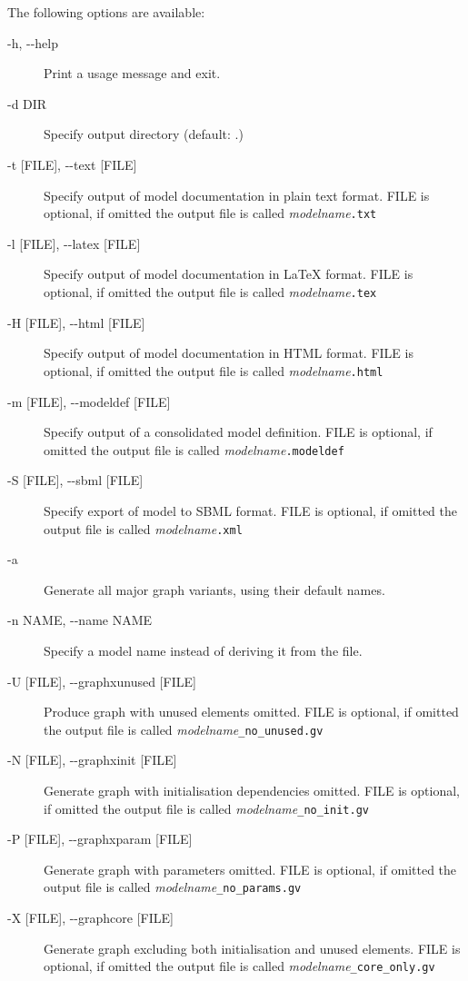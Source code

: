 \documentclass[a4paper,11pt]{article}
\begin{document}
The following options are available:

\begin{adjustwidth}{0.8cm}{0.8cm}
\begin{description}
\item[-h, -{}-help] Print a usage message and exit.
\item[-d DIR] Specify output directory (default: .)
\item[-t {[}FILE{]}, -{}-text {[}FILE{]}] Specify output of model documentation in plain text format. FILE is optional, if omitted the output file is called \textit{modelname}\texttt{.txt}
\item[-l {[}FILE{]}, -{}-latex {[}FILE{]}] Specify output of model documentation in \LaTeX{} format. FILE is optional, if omitted the output file is called \textit{modelname}\texttt{.tex}
\item[-H {[}FILE{]}, -{}-html {[}FILE{]}] Specify output of model documentation in HTML format. FILE is optional, if omitted the output file is called \textit{modelname}\texttt{.html}
\item[-m {[}FILE{]}, -{}-modeldef {[}FILE{]}] Specify output of a consolidated model definition. FILE is optional, if omitted the output file is called \textit{modelname}\texttt{.modeldef}
\item[-S {[}FILE{]}, -{}-sbml {[}FILE{]}] Specify export of model to SBML format. FILE is optional, if omitted the output file is called \textit{modelname}\texttt{.xml}
\item[-a] Generate all major graph variants, using their default names.
\item[-n NAME, -{}-name NAME] Specify a model name instead of deriving it from the file.
\item[-U {[}FILE{]}, -{}-graphxunused {[}FILE{]}] Produce graph with unused elements omitted. FILE is optional, if omitted the output file is called \textit{modelname}\texttt{\_no\_unused.gv}
\item[-N {[}FILE{]}, -{}-graphxinit {[}FILE{]}] Generate graph with initialisation dependencies omitted. FILE is optional, if omitted the output file is called \textit{modelname}\texttt{\_no\_init.gv}
\item[-P {[}FILE{]}, -{}-graphxparam {[}FILE{]}] Generate graph with parameters omitted. FILE is optional, if omitted the output file is called \textit{modelname}\texttt{\_no\_params.gv}
\item[-X {[}FILE{]}, -{}-graphcore {[}FILE{]}] Generate graph excluding both initialisation and unused elements. FILE is optional, if omitted the output file is called \textit{modelname}\texttt{\_core\_only.gv}

\end{description}
\end{adjustwidth}
\end{document}
